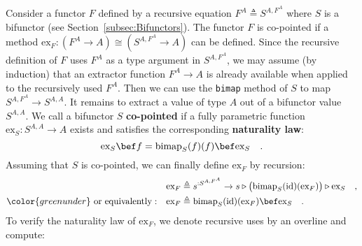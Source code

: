 Consider a functor $F$ defined by a recursive equation $F^{A}\triangleq S^{A,F^{A}}$
where $S$ is a bifunctor (see Section~\ref{subsec:Bifunctors}).
The functor $F$ is co-pointed if a method $\text{ex}_{F}:(F^{A}\rightarrow A)\cong(S^{A,F^{A}}\rightarrow A)$
can be defined. Since the recursive definition of $F$ uses $F^{A}$
as a type argument in $S^{A,F^{A}}$, we may assume (by induction)
that an extractor function $F^{A}\rightarrow A$ is already available
when applied to the recursively used $F^{A}$. Then we can use the
\lstinline!bimap! method of $S$ to map $S^{A,F^{A}}\rightarrow S^{A,A}$.
It remains to extract a value of type $A$ out of a bifunctor value
$S^{A,A}$. We call a bifunctor $S$ \textbf{co-pointed}
if a fully parametric function $\text{ex}_{S}:S^{A,A}\rightarrow A$
exists and satisfies the corresponding \textbf{naturality law}:
\begin{equation}
\text{ex}_{S}\bef f=\text{bimap}_{S}(f)(f)\bef\text{ex}_{S}\quad.\label{eq:copointed-bifunctor-naturality-law}
\end{equation}
Assuming that $S$ is co-pointed, we can finally define $\text{ex}_{F}$
by recursion:
\begin{align*}
 & \text{ex}_{F}\triangleq s^{:S^{A,F^{A}}}\rightarrow s\triangleright\big(\text{bimap}_{S}(\text{id})(\text{ex}_{F})\big)\triangleright\text{ex}_{S}\quad,\\
{\color{greenunder}\text{ or equivalently}:}\quad & \text{ex}_{F}\triangleq\text{bimap}_{S}(\text{id})(\text{ex}_{F})\bef\text{ex}_{S}\quad.
\end{align*}
To verify the naturality law of $\text{ex}_{F}$, we denote recursive
uses by an overline and compute:
